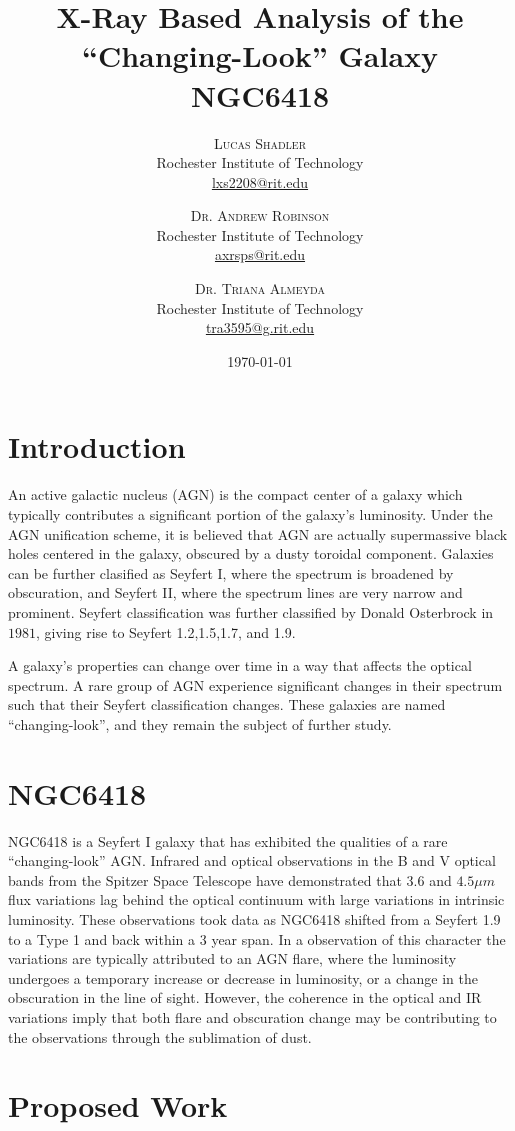 \documentclass[twoside,twocolumn]{article}
\title{X-Ray Based Analysis of the ``Changing-Look'' Galaxy NGC6418} %
\author{%
\textsc{Lucas Shadler} \\ %
\normalsize Rochester Institute of Technology \\ %
\normalsize \href{mailto:lxs2208@rit.edu}{lxs2208@rit.edu} %
\and %
\textsc{Dr. Andrew Robinson} \\[1ex] %
\normalsize Rochester Institute of Technology \\ %
\normalsize \href{mailto:axrsps@rit.edu}{axrsps@rit.edu} %
\and %
\textsc{Dr. Triana Almeyda} \\[1ex] %
\normalsize Rochester Institute of Technology \\ %
\normalsize \href{mailto:tra3595@g.rit.edu}{tra3595@g.rit.edu} %
}
\date{\today} %
\begin{document}
\maketitle

\section{Introduction}

An active galactic nucleus (AGN) is the compact center of a galaxy which typically contributes a significant portion of the galaxy's luminosity. Under the AGN unification scheme, it is believed that AGN are actually supermassive black holes centered in the galaxy, obscured by a dusty toroidal component. Galaxies can be further clasified as Seyfert I, where the spectrum is broadened by obscuration, and Seyfert II, where the spectrum lines are very narrow and prominent. Seyfert classification was further classified by Donald Osterbrock in $1981$, giving rise to Seyfert 1.2,1.5,1.7, and 1.9.

A galaxy's properties can change over time in a way that affects the optical spectrum. A rare group of AGN experience significant changes in their spectrum such that their Seyfert classification changes. These galaxies are named ``changing-look'', and they remain the subject of further study.
\section{NGC6418}

NGC6418 is a Seyfert I galaxy that has exhibited the qualities of a rare ``changing-look'' AGN. Infrared and optical observations in the B and V optical bands from the Spitzer Space Telescope have 
demonstrated that $3.6$ and $4.5 \mu m$ flux variations lag behind the optical 
continuum with large variations in intrinsic luminosity. These observations took data
as NGC6418 shifted from a Seyfert 1.9 to a Type 1 and back within a 3 year span. In a observation of this character the variations are typically attributed to an AGN flare, where the luminosity undergoes a temporary increase or decrease in luminosity, or a change in the obscuration in the line of sight. However, the coherence in the optical and IR variations imply that both flare and obscuration change may be contributing to the observations through the sublimation of dust.

\section{Proposed Work}
\end{document}
